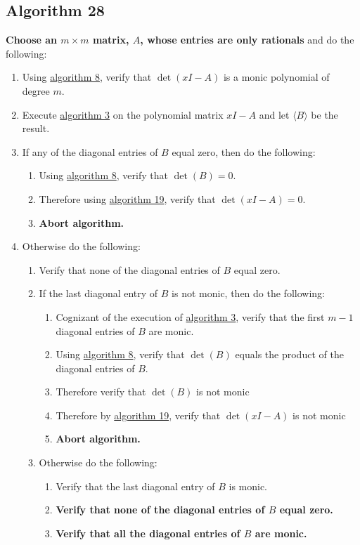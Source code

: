 \documentclass[twocolumn]{article}
\begin{document}
		\subsection{Algorithm 28}\label{sec:algorithm 28}
			\textbf{Choose an $m\times m$ matrix, $A$, whose entries are only rationals} and do the following:
			\begin{enumerate}
				\item Using \hyperref[sec:algorithm 8]{algorithm 8}, verify that $\det(xI-A)$ is a monic polynomial of degree $m$.
				\item Execute \hyperref[sec:algorithm 3]{algorithm 3} on the polynomial matrix $xI-A$ and let $\langle B\rangle$ be the result.
				\item If any of the diagonal entries of $B$ equal zero, then do the following:
				\begin{enumerate}
					\item Using \hyperref[sec:algorithm 8]{algorithm 8}, verify that $\det(B)=0$.
					\item Therefore using \hyperref[sec:algorithm 19]{algorithm 19}, verify that $\det(xI-A)=0$.
					\item \textbf{Abort algorithm.}
				\end{enumerate}
				\item Otherwise do the following:
				\begin{enumerate}
					\item Verify that none of the diagonal entries of $B$ equal zero.
					\item If the last diagonal entry of $B$ is not monic, then do the following:
					\begin{enumerate}
						\item Cognizant of the execution of \hyperref[sec:algorithm 3]{algorithm 3}, verify that the first $m-1$ diagonal entries of $B$ are monic.
						\item Using \hyperref[sec:algorithm 8]{algorithm 8}, verify that $\det(B)$ equals the product of the diagonal entries of $B$.
						\item Therefore verify that $\det(B)$ is not monic
						\item Therefore by \hyperref[sec:algorithm 19]{algorithm 19}, verify that $\det(xI-A)$ is not monic
						\item \textbf{Abort algorithm.}
					\end{enumerate}
					\item Otherwise do the following:
					\begin{enumerate}
						\item Verify that the last diagonal entry of $B$ is monic.
						\item \textbf{Verify that none of the diagonal entries of $B$ equal zero.}
						\item \textbf{Verify that all the diagonal entries of $B$ are monic.}
					\end{enumerate}
				\end{enumerate}
			\end{enumerate}
\end{document}
